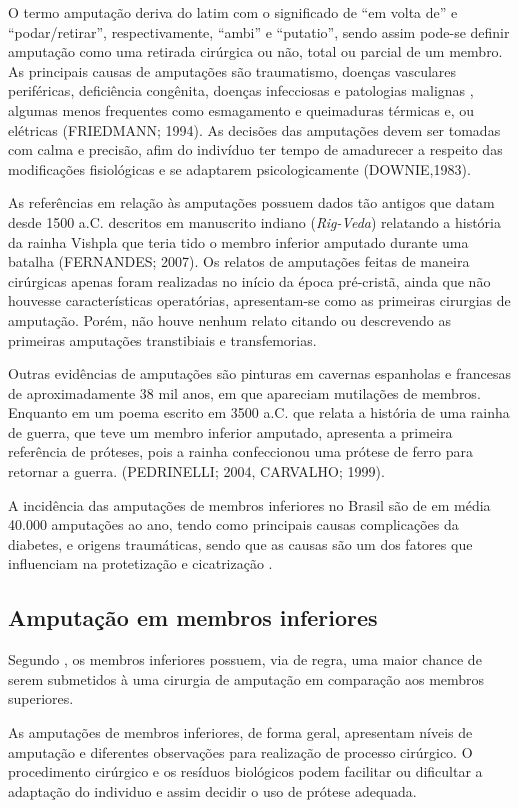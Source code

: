 O termo amputação deriva do latim com o significado de “em volta de” e “podar/retirar”, respectivamente, “ambi” e “putatio”, sendo assim pode-se definir amputação como uma retirada cirúrgica ou não, total ou parcial de um membro.  As principais causas de amputações são traumatismo, doenças vasculares periféricas, deficiência congênita, doenças infecciosas e patologias malignas \cite{Carvalho2003}, algumas menos frequentes como esmagamento e queimaduras térmicas e, ou elétricas (FRIEDMANN; 1994). As decisões das amputações devem ser tomadas com calma e precisão, afim do indivíduo ter tempo de amadurecer a respeito das modificações fisiológicas e se adaptarem psicologicamente (DOWNIE,1983).


As referências em relação às amputações possuem dados tão antigos que datam desde 1500 a.C. descritos em manuscrito indiano (\textit{Rig-Veda}) relatando a história da rainha Vishpla que teria tido o membro inferior amputado durante uma batalha (FERNANDES; 2007). Os relatos de amputações feitas de maneira cirúrgicas apenas foram realizadas no início da época pré-cristã, ainda que não houvesse características operatórias, apresentam-se como as primeiras cirurgias de amputação. Porém, não houve nenhum relato citando ou descrevendo as primeiras amputações transtibiais e transfemorias.


Outras evidências de amputações são pinturas em cavernas espanholas e francesas de aproximadamente 38 mil anos, em que apareciam mutilações de membros. Enquanto em um poema escrito em 3500 a.C. que relata a história de uma rainha de guerra, que teve um membro inferior amputado, apresenta a primeira referência de próteses, pois a rainha confeccionou uma prótese de ferro para retornar a guerra. (PEDRINELLI; 2004, CARVALHO; 1999).

A incidência das amputações de membros inferiores no Brasil são de em média 40.000 amputações ao ano, tendo como principais causas complicações da diabetes, e origens traumáticas, sendo que as causas são um dos fatores que influenciam na protetização e cicatrização \cite{Reis2012}.

\subsection{Amputação em membros inferiores}
    Segundo \cite{Barreto2013}, os membros inferiores possuem, via de regra, uma maior chance de serem submetidos à uma cirurgia de amputação em comparação aos membros superiores.

    As amputações de membros inferiores, de forma geral, apresentam níveis de amputação e diferentes observações para realização de processo cirúrgico.  O procedimento cirúrgico e os resíduos biológicos podem facilitar ou dificultar a adaptação do individuo e assim decidir o uso de prótese adequada.

